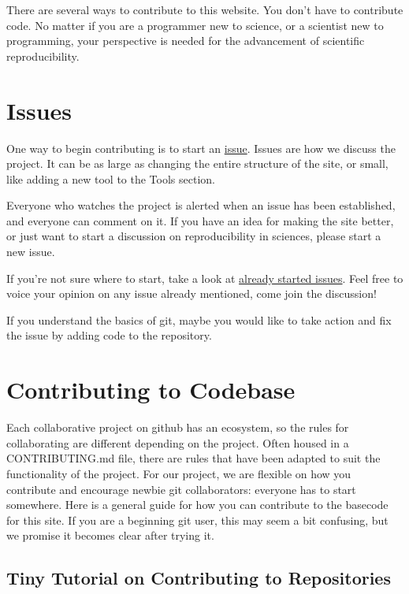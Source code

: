 \documentclass[
]{book}
\theoremstyle{definition}
\theoremstyle{definition}
\theoremstyle{definition}
\theoremstyle{definition}
\theoremstyle{remark}
\begin{document}
There are several ways to contribute to this website. You don't have to contribute code. No matter if you are a programmer new to science, or a scientist new to programming, your perspective is needed for the advancement of scientific reproducibility.

\hypertarget{issues}{%
\section{Issues}\label{issues}}

One way to begin contributing is to start an \href{https://github.com/ropensci/reproducibility-guide/issues?state=open}{issue}. Issues are how we discuss the project. It can be as large as changing the entire structure of the site, or small, like adding a new tool to the Tools section.

Everyone who watches the project is alerted when an issue has been established, and everyone can comment on it. If you have an idea for making the site better, or just want to start a discussion on reproducibility in sciences, please start a new issue.

If you're not sure where to start, take a look at \href{https://github.com/ropensci/reproducibility-guide/issues?state=open}{already started issues}. Feel free to voice your opinion on any issue already mentioned, come join the discussion!

If you understand the basics of git, maybe you would like to take action and fix the issue by adding code to the repository.

\hypertarget{contributing-to-codebase}{%
\section{Contributing to Codebase}\label{contributing-to-codebase}}

Each collaborative project on github has an ecosystem, so the rules for collaborating are different depending on the project. Often housed in a CONTRIBUTING.md file, there are rules that have been adapted to suit the functionality of the project. For our project, we are flexible on how you contribute and encourage newbie git collaborators: everyone has to start somewhere. Here is a general guide for how you can contribute to the basecode for this site. If you are a beginning git user, this may seem a bit confusing, but we promise it becomes clear after trying it.

\hypertarget{tiny-tutorial-on-contributing-to-repositories}{%
\subsection{Tiny Tutorial on Contributing to Repositories}\label{tiny-tutorial-on-contributing-to-repositories}}
\end{document}
